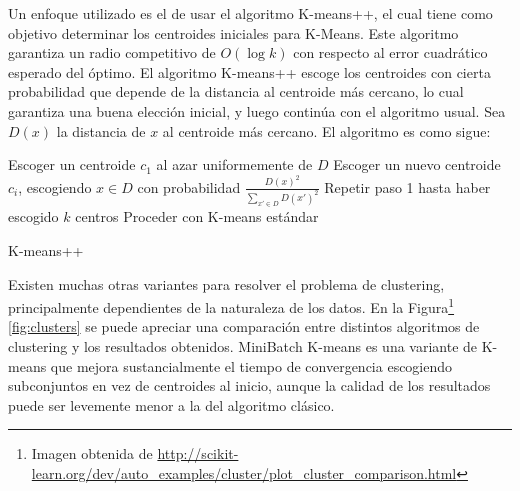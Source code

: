 \documentclass[upright, contnum]{umemoria}
\begin{document}
    Un enfoque utilizado es el de usar el algoritmo
    K-means++\cite{Arthur:2007:KAC:1283383.1283494}, el cual tiene
    como objetivo determinar los centroides iniciales para
    K-Means. Este algoritmo garantiza un radio competitivo de 
    $O(\log k)$ con respecto al error cuadrático esperado del óptimo.
    El algoritmo K-means++ escoge los centroides con cierta
    probabilidad que depende de la distancia al centroide más cercano,
    lo cual garantiza una buena elección inicial, y luego continúa con
    el algoritmo usual. Sea $D(x)$ la distancia de $x$ al centroide
    más cercano. El algoritmo es como sigue:

\begin{algorithm}[H]
Escoger un centroide $c_1$ al azar uniformemente de $D$\;
Escoger un nuevo centroide $c_i$, escogiendo $x \in D$ con probabilidad $\frac{D(x)^2}{\sum_{x' \in D}D(x')^2}$\;
Repetir paso 1 hasta haber escogido $k$ centros\;
Proceder con K-means estándar\;
 \caption{K-means++}
\end{algorithm}
    

    Existen muchas otras variantes para resolver el problema de
    clustering, principalmente dependientes de la naturaleza de los
    datos. En la Figura\footnote{Imagen obtenida de \href{http://scikit-learn.org/dev/auto\_examples/cluster/plot\_cluster\_comparison.html}{http://scikit-learn.org/dev/auto\_examples/cluster/plot\_cluster\_comparison.html} }
     \ref{fig:clusters} se puede apreciar una
    comparación entre distintos algoritmos de clustering y los
    resultados obtenidos. MiniBatch K-means es una variante de K-means
    que mejora sustancialmente el tiempo de convergencia escogiendo
    subconjuntos en vez de centroides al inicio, aunque la calidad de
    los resultados puede ser levemente menor a la del algoritmo
    clásico\cite{Sculley:2010:WKC:1772690.1772862}.
\end{document}
